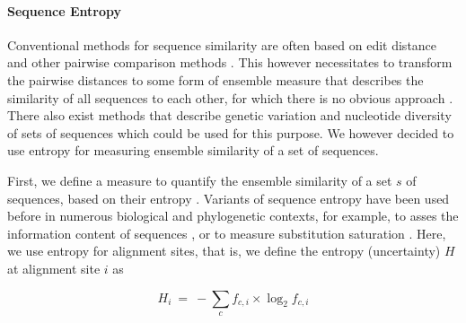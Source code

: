 

\paragraph{Sequence Entropy}
\label{ch:AutomaticTrees:sec:Methods:sub:PhAT:par:SequenceEntropy}

Conventional methods for sequence similarity are often based on edit distance
and other pairwise comparison methods \cite{Needleman1970,Smith1981,Altschul1990}.
This however necessitates to transform the pairwise distances to some form of ensemble measure
that describes the similarity of all sequences to each other, for which there is no obvious approach \cite{Zhou2006}.
There also exist methods that describe genetic variation and
nucleotide diversity of sets of sequences \cite{Nei1979,Blaisdell1986} which could be used for this purpose.
We however decided to use entropy for measuring ensemble similarity of a set of sequences.

First, we define a measure to quantify the ensemble similarity of a set $s$ of sequences,
based on their entropy \cite{Shannon1951}.
Variants of sequence entropy have been used before in numerous biological and phylogenetic contexts,
for example, to asses the information content of sequences
\cite{Schmitt1997,Vinga2003,Vinga2004,Li2005,Criscuolo2010,Comin2012,Vinga2014},
or to measure substitution saturation \cite{Xia2003}.
Here, we use entropy for alignment sites, that is, we define the entropy (uncertainty) $H$ at alignment site $i$ as

\begin{equation*}
    H_{i} ~=~ -\sum_c f_{c,i} \times \log_{2} f_{c,i}
\end{equation*}

